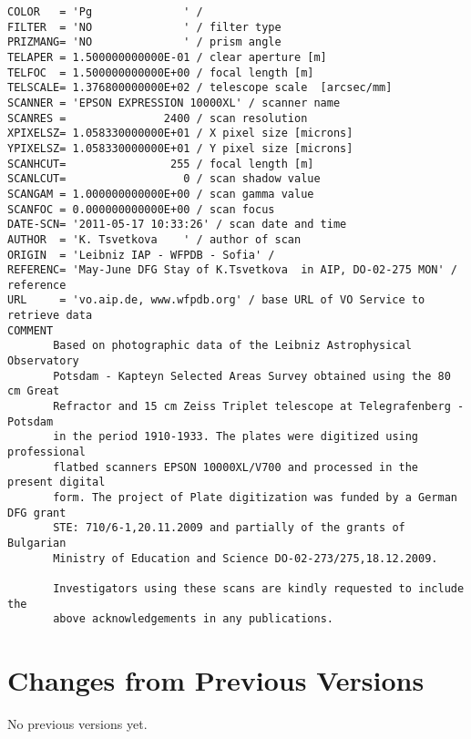 \documentclass[11pt]{ivoa}
\begin{document}
\begin{lstlisting}
COLOR   = 'Pg              ' /
FILTER  = 'NO              ' / filter type
PRIZMANG= 'NO              ' / prism angle
TELAPER = 1.500000000000E-01 / clear aperture [m]
TELFOC  = 1.500000000000E+00 / focal length [m]
TELSCALE= 1.376800000000E+02 / telescope scale  [arcsec/mm]
SCANNER = 'EPSON EXPRESSION 10000XL' / scanner name
SCANRES =               2400 / scan resolution
XPIXELSZ= 1.058330000000E+01 / X pixel size [microns]
YPIXELSZ= 1.058330000000E+01 / Y pixel size [microns]
SCANHCUT=                255 / focal length [m]
SCANLCUT=                  0 / scan shadow value
SCANGAM = 1.000000000000E+00 / scan gamma value
SCANFOC = 0.000000000000E+00 / scan focus
DATE-SCN= '2011-05-17 10:33:26' / scan date and time
AUTHOR  = 'K. Tsvetkova    ' / author of scan
ORIGIN  = 'Leibniz IAP - WFPDB - Sofia' /
REFERENC= 'May-June DFG Stay of K.Tsvetkova  in AIP, DO-02-275 MON' / reference
URL     = 'vo.aip.de, www.wfpdb.org' / base URL of VO Service to retrieve data
COMMENT
       Based on photographic data of the Leibniz Astrophysical Observatory
       Potsdam - Kapteyn Selected Areas Survey obtained using the 80 cm Great
       Refractor and 15 cm Zeiss Triplet telescope at Telegrafenberg - Potsdam
       in the period 1910-1933. The plates were digitized using professional
       flatbed scanners EPSON 10000XL/V700 and processed in the present digital
       form. The project of Plate digitization was funded by a German DFG grant
       STE: 710/6-1,20.11.2009 and partially of the grants of Bulgarian
       Ministry of Education and Science DO-02-273/275,18.12.2009.

       Investigators using these scans are kindly requested to include the
       above acknowledgements in any publications.

\end{lstlisting}

\appendix
\section{Changes from Previous Versions}

No previous versions yet.  



\end{document}
